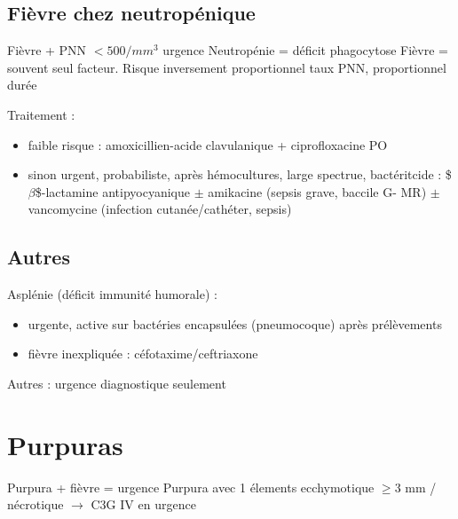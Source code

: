 \documentclass{article}
\newcommand*{\TakeFourierOrnament}[1]{{%
\fontencoding{U}\fontfamily{futs}\selectfont\char#1}}
\newcommand*{\danger}{\TakeFourierOrnament{66}}
\begin{document}
\subsection{Fièvre chez neutropénique}
\label{sec:org077134a}
Fièvre + PNN \(< 500/mm^3\) urgence \skull
Neutropénie = déficit phagocytose
Fièvre = souvent seul facteur.
Risque inversement proportionnel taux PNN, proportionnel durée

Traitement :
\begin{itemize}
\item faible risque : amoxicillien-acide clavulanique + ciprofloxacine PO
\item sinon urgent, probabiliste, après hémocultures, large spectrue, bactéritcide : \$\(\beta\)\$-lactamine antipyocyanique \(\pm\) amikacine (sepsis grave, baccile G- MR) \(\pm\) vancomycine (infection cutanée/cathéter, sepsis)
\end{itemize}


\subsection{Autres}
\label{sec:org8c06c0e}
Asplénie (déficit immunité humorale) : 
\begin{itemize}
\item urgente, active sur bactéries encapsulées (pneumocoque) après prélèvements
\item fièvre inexpliquée : céfotaxime/ceftriaxone
\end{itemize}
Autres : urgence diagnostique seulement

\section{Purpuras}
\label{sec:orga164eae}
\danger Purpura + fièvre = urgence 
\danger Purpura avec 1 élements ecchymotique $\ge 3$ mm / nécrotique $\to$ C3G
IV en urgence \skull
\end{document}
